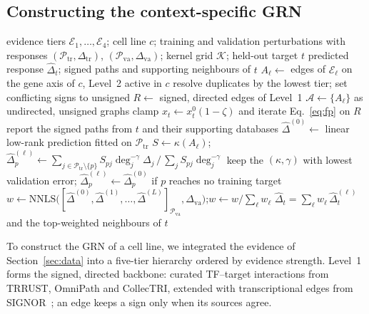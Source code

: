 \subsection{Constructing the context-specific GRN}
\label{sec:grn}
\begin{algorithm}[!tb]
\caption{iPerturb: context-specific GRN assembly and integrated propagation}
\label{alg:iperturb}
\small
\begin{algorithmic}[1]
\Require evidence tiers $\mathcal{E}_1,\dots,\mathcal{E}_4$; cell line $c$; training and validation perturbations with responses $(\mathcal{P}_{\mathrm{tr}},\Delta_{\mathrm{tr}})$, $(\mathcal{P}_{\mathrm{va}},\Delta_{\mathrm{va}})$; kernel grid $\mathcal{K}$; held-out target $t$
\Ensure predicted response $\hat\Delta_t$; signed paths and supporting neighbours of $t$
\State $A_\ell \gets$ edges of $\mathcal{E}_\ell$ on the gene axis of $c$, Level~2 active in $c$ 
\State resolve duplicates by the lowest tier; set conflicting signs to unsigned
\State $R \gets$ signed, directed edges of Level~1 
\State $\mathcal{A} \gets \{A_\ell\}$ as undirected, unsigned graphs 
\State clamp $x_t \gets x_t^{0}(1-\zeta)$ and iterate Eq.~\eqref{eq:fp} on $R$ 
\State report the signed paths from $t$ and their supporting databases 
\State $\hat\Delta^{(0)} \gets$ linear low-rank prediction fitted on $\mathcal{P}_{\mathrm{tr}}$
    \State $S \gets \kappa(A_\ell)$;\quad $\hat\Delta^{(\ell)}_p \gets \sum_{j\in\mathcal{P}_{\mathrm{tr}}\setminus\{p\}} S_{pj}\deg_j^{-\gamma}\Delta_j \,/\, \sum_{j} S_{pj}\deg_j^{-\gamma}$
  \EndFor
  \State keep the $(\kappa,\gamma)$ with lowest validation error; $\hat\Delta^{(\ell)}_p\gets\hat\Delta^{(0)}_p$ if $p$ reaches no training target
\EndFor
\State $w \gets \mathrm{NNLS}\big([\hat\Delta^{(0)},\hat\Delta^{(1)},\dots,\hat\Delta^{(L)}]_{\mathcal{P}_{\mathrm{va}}},\Delta_{\mathrm{va}}\big)$;\quad $w \gets w/\textstyle\sum_\ell w_\ell$
\State \Return $\hat\Delta_t=\sum_\ell w_\ell\,\hat\Delta^{(\ell)}_t$ and the top-weighted neighbours of $t$
\end{algorithmic}
\end{algorithm}
To construct the GRN of a cell line, we integrated the evidence of Section~\ref{sec:data} into a five-tier hierarchy ordered by evidence strength.
Level~1 forms the signed, directed backbone: curated TF--target interactions from TRRUST, OmniPath and CollecTRI, extended with transcriptional edges from SIGNOR~\cite{losurdo2023signor}; an edge keeps a sign only when its sources agree.
